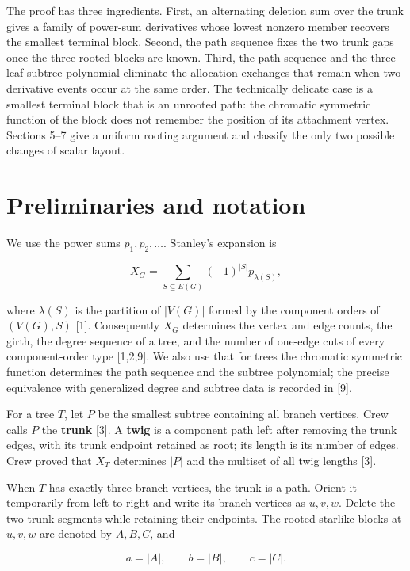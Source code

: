 \documentclass[11pt]{article}
\begin{document}
The proof has three ingredients. First, an alternating deletion sum over the trunk gives a family
of power-sum derivatives whose lowest nonzero member recovers the smallest terminal block. Second,
the path sequence fixes the two trunk gaps once the three rooted blocks are known. Third, the path
sequence and the three-leaf subtree polynomial eliminate the allocation exchanges that remain when
two derivative events occur at the same order. The technically delicate case is a smallest terminal
block that is an unrooted path: the chromatic symmetric function of the block does not remember the
position of its attachment vertex. Sections 5--7 give a uniform rooting argument and classify the
only two possible changes of scalar layout.

\section{Preliminaries and notation}


We use the power sums $p_1,p_2,\ldots$. Stanley's expansion is

\begin{equation*}
X_G=\sum_{S\subseteq E(G)}(-1)^{|S|}p_{\lambda(S)},
\tag{2.1}
\end{equation*}


where $\lambda(S)$ is the partition of $|V(G)|$ formed by the component orders of $(V(G),S)$
[1]. Consequently $X_G$ determines the vertex and edge counts, the girth, the degree sequence of a
tree, and the number of one-edge cuts of every component-order type [1,2,9]. We also use that for
trees the chromatic symmetric function determines the path sequence and the subtree polynomial;
the precise equivalence with generalized degree and subtree data is recorded in [9].

For a tree $T$, let $P$ be the smallest subtree containing all branch vertices. Crew calls $P$ the
\textbf{trunk} [3]. A \textbf{twig} is a component path left after removing the trunk edges, with its trunk
endpoint retained as root; its length is its number of edges. Crew proved that $X_T$ determines
$|P|$ and the multiset of all twig lengths [3].

When $T$ has exactly three branch vertices, the trunk is a path. Orient it temporarily from left to
right and write its branch vertices as $u,v,w$. Delete the two trunk segments while retaining their
endpoints. The rooted starlike blocks at $u,v,w$ are denoted by $A,B,C$, and

\begin{equation*}
a=|A|,\qquad b=|B|,\qquad c=|C|.
\end{equation*}
\end{document}
